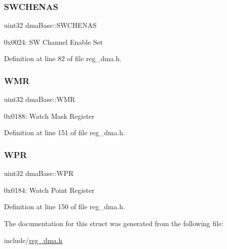 \subsubsection{\texorpdfstring{S\+W\+C\+H\+E\+N\+AS}{SWCHENAS}}
{\footnotesize\ttfamily uint32 dma\+Base\+::\+S\+W\+C\+H\+E\+N\+AS}

0x0024\+: SW Channel Enable Set 

Definition at line 82 of file reg\+\_\+dma.\+h.

\mbox{\label{structdmaBase_a5f8c7cfdf49c28abc840fa9f93a82462}} 
\subsubsection{\texorpdfstring{W\+MR}{WMR}}
{\footnotesize\ttfamily uint32 dma\+Base\+::\+W\+MR}

0x0188\+: Watch Mask Register 

Definition at line 151 of file reg\+\_\+dma.\+h.

\mbox{\label{structdmaBase_a6794590df81c6e66215eefbf20bac984}} 
\subsubsection{\texorpdfstring{W\+PR}{WPR}}
{\footnotesize\ttfamily uint32 dma\+Base\+::\+W\+PR}

0x0184\+: Watch Point Register 

Definition at line 150 of file reg\+\_\+dma.\+h.



The documentation for this struct was generated from the following file\+:\begin{DoxyCompactItemize}
\item 
include/\mbox{\hyperlink{reg__dma_8h}{reg\+\_\+dma.\+h}}\end{DoxyCompactItemize}
